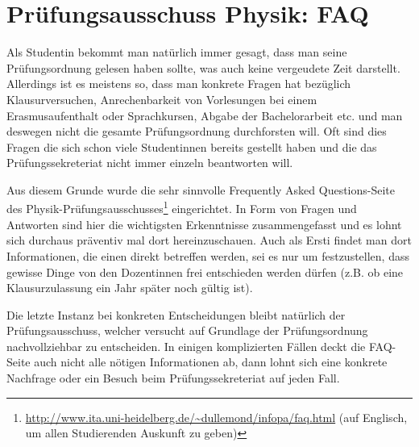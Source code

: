 \section{Prüfungsausschuss Physik: FAQ}
Als Studentin bekommt man natürlich immer gesagt, dass man seine Prüfungsordnung gelesen haben sollte, was auch keine vergeudete Zeit darstellt. Allerdings ist es meistens so, dass man konkrete Fragen hat bezüglich Klausurversuchen, Anrechenbarkeit von Vorlesungen bei einem Erasmusaufenthalt oder Sprachkursen, Abgabe der Bachelorarbeit etc. und man deswegen nicht die gesamte Prüfungsordnung durchforsten will. Oft sind dies Fragen die sich schon viele Studentinnen bereits gestellt haben und die das Prüfungssekreteriat nicht immer einzeln beantworten will. 

Aus diesem Grunde wurde die sehr sinnvolle Frequently Asked Questions-Seite des Physik-Prüfungsausschusses\footnote{\url{http://www.ita.uni-heidelberg.de/~dullemond/infopa/faq.html} (auf Englisch, um allen Studierenden Auskunft zu geben)} eingerichtet. In Form von Fragen und Antworten sind hier die wichtigsten Erkenntnisse zusammengefasst und es lohnt sich durchaus präventiv mal dort hereinzuschauen. Auch als Ersti findet man dort Informationen, die einen direkt betreffen werden, sei es nur um festzustellen, dass gewisse Dinge von den Dozentinnen frei entschieden werden dürfen (z.B. ob eine Klausurzulassung ein Jahr später noch gültig ist).

Die letzte Instanz bei konkreten Entscheidungen bleibt natürlich der Prüfungsausschuss, welcher versucht auf Grundlage der Prüfungsordnung nachvollziehbar zu entscheiden. In einigen komplizierten Fällen deckt die FAQ-Seite auch nicht alle nötigen Informationen ab, dann lohnt sich eine konkrete Nachfrage oder ein Besuch beim Prüfungssekreteriat auf jeden Fall.
